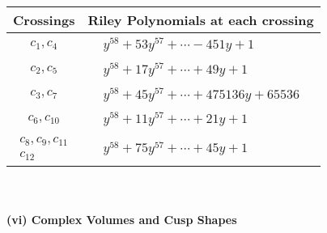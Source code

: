 \documentclass[1p]{elsarticle_modified}
\theoremstyle{definition}
\begin{document}
\begin{tabular}{m{50pt}|m{274pt}}
Crossings & \hspace{64pt}Riley Polynomials at each crossing \\
\hline $$\begin{aligned}c_{1},c_{4}\end{aligned}$$&$\begin{aligned}
&y^{58}+53 y^{57}+\cdots-451 y+1
\end{aligned}$\\
\hline $$\begin{aligned}c_{2},c_{5}\end{aligned}$$&$\begin{aligned}
&y^{58}+17 y^{57}+\cdots+49 y+1
\end{aligned}$\\
\hline $$\begin{aligned}c_{3},c_{7}\end{aligned}$$&$\begin{aligned}
&y^{58}+45 y^{57}+\cdots+475136 y+65536
\end{aligned}$\\
\hline $$\begin{aligned}c_{6},c_{10}\end{aligned}$$&$\begin{aligned}
&y^{58}+11 y^{57}+\cdots+21 y+1
\end{aligned}$\\
\hline $$\begin{aligned}c_{8},c_{9},c_{11}\\c_{12}\end{aligned}$$&$\begin{aligned}
&y^{58}+75 y^{57}+\cdots+45 y+1
\end{aligned}$\\
\hline
\end{tabular}\\~\\
\newpage\flushleft \textbf{(vi) Complex Volumes and Cusp Shapes}
\end{document}
